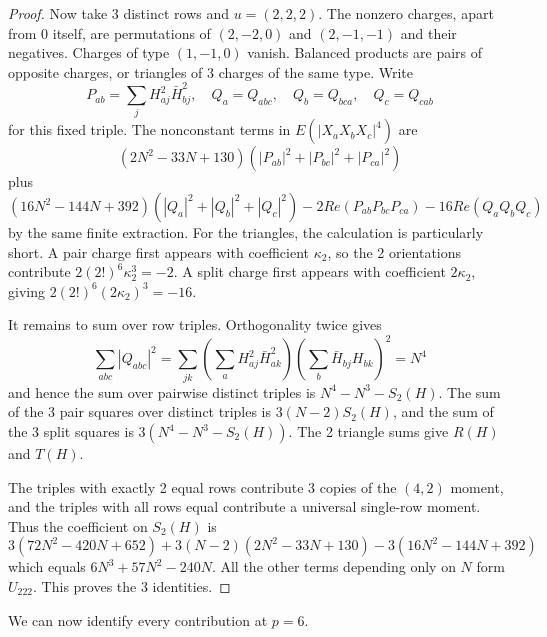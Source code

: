 \documentclass[11pt,a4paper]{article}
\theoremstyle{remark}
\begin{document}
\begin{proof}
Now take 3 distinct rows and $u=(2,2,2)$. The nonzero charges, apart from 0 itself, are permutations of $(2,-2,0)$ and $(2,-1,-1)$ and their negatives. Charges of type $(1,-1,0)$ vanish. Balanced products are pairs of opposite charges, or triangles of 3 charges of the same type. Write
\[
 P_{ab}=\sum_jH_{aj}^2\bar H_{bj}^2,\quad
 Q_a=Q_{abc},\quad Q_b=Q_{bca},\quad Q_c=Q_{cab}
\]
for this fixed triple. The nonconstant terms in $E(|X_aX_bX_c|^4)$ are
\[
 (2N^2-33N+130)(|P_{ab}|^2+|P_{bc}|^2+|P_{ca}|^2)
\]
plus
\[
 (16N^2-144N+392)(|Q_a|^2+|Q_b|^2+|Q_c|^2)
       -2Re(P_{ab}P_{bc}P_{ca})-16Re(Q_aQ_bQ_c)
\]
by the same finite extraction. For the triangles, the calculation is particularly short. A pair charge first appears with coefficient $\kappa_2$, so the 2 orientations contribute $2(2!)^6\kappa_2^3=-2$. A split charge first appears with coefficient $2\kappa_2$, giving $2(2!)^6(2\kappa_2)^3=-16$.

It remains to sum over row triples. Orthogonality twice gives
\[
 \sum_{abc}|Q_{abc}|^2
   =\sum_{jk}\left(\sum_aH_{aj}^2\bar H_{ak}^2\right)
                  \left(\sum_b\bar H_{bj}H_{bk}\right)^2=N^4
\]
and hence the sum over pairwise distinct triples is $N^4-N^3-S_2(H)$. The sum of the 3 pair squares over distinct triples is $3(N-2)S_2(H)$, and the sum of the 3 split squares is $3(N^4-N^3-S_2(H))$. The 2 triangle sums give $R(H)$ and $T(H)$.

The triples with exactly 2 equal rows contribute 3 copies of the $(4,2)$ moment, and the triples with all rows equal contribute a universal single-row moment. Thus the coefficient on $S_2(H)$ is
\[
 3(72N^2-420N+652)+3(N-2)(2N^2-33N+130)
                       -3(16N^2-144N+392)
\]
which equals $6N^3+57N^2-240N$. All the other terms depending only on $N$ form $U_{222}$. This proves the 3 identities.
\end{proof}

We can now identify every contribution at $p=6$.
\end{document}
